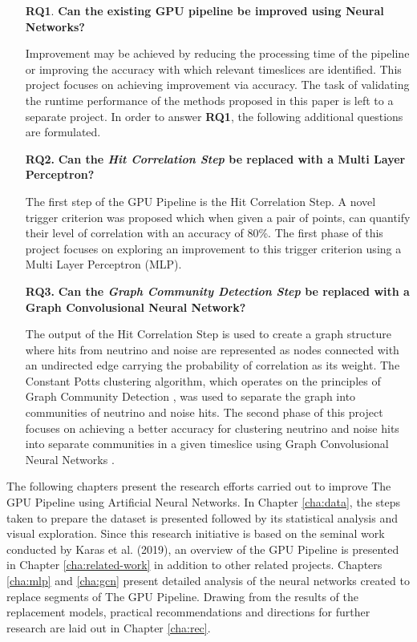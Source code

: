 \begin{enumerate}
  \item[\textbf{RQ1}.] \textbf{Can the existing GPU pipeline be improved using Neural Networks?}

    Improvement may be achieved by reducing the processing time of the
    pipeline or improving the accuracy with which relevant timeslices
    are identified. This project focuses on achieving improvement via
    accuracy. The task of validating the runtime performance of the
    methods proposed in this paper is left to a separate project. In
    order to answer \textbf{RQ1}, the following additional questions
    are formulated.

  \item[\textbf{RQ2.}] \textbf{Can the \emph{Hit Correlation Step} be replaced with a Multi Layer Perceptron?}

    The first step of the GPU Pipeline is the Hit Correlation Step. A
    novel trigger criterion was proposed which when given a pair of
    points, can quantify their level of correlation with an accuracy
    of 80\%. The first phase of this project focuses on exploring an
    improvement to this trigger criterion using a Multi Layer
    Perceptron (MLP).
    
  \item[\textbf{RQ3.}] \textbf{Can the \emph{Graph Community Detection Step} be replaced with a Graph Convolusional Neural Network?}

    The output of the Hit Correlation Step is used to create a graph
    structure where hits from neutrino and noise are represented as
    nodes connected with an undirected edge carrying the probability
    of correlation as its weight. The Constant Potts clustering
    algorithm, which operates on the principles of Graph Community
    Detection \cite{fortunato2010community}, was used to separate the
    graph into communities of neutrino and noise hits. The second
    phase of this project focuses on achieving a better accuracy for
    clustering neutrino and noise hits into separate communities in a
    given timeslice using Graph Convolusional Neural Networks
    \cite{kipf2016semi}.
\end{enumerate}

The following chapters present the research efforts carried out to
improve The GPU Pipeline using Artificial Neural Networks. In Chapter
\ref{cha:data}, the steps taken to prepare the dataset is presented
followed by its statistical analysis and visual exploration. Since
this research initiative is based on the seminal work conducted by
Karas et al. (2019), an overview of the GPU Pipeline is presented in
Chapter \ref{cha:related-work} in addition to other related projects.
Chapters \ref{cha:mlp} and \ref{cha:gcn} present detailed analysis of
the neural networks created to replace segments of The GPU Pipeline.
Drawing from the results of the replacement models, practical
recommendations and directions for further research are laid out in
Chapter \ref{cha:rec}.

